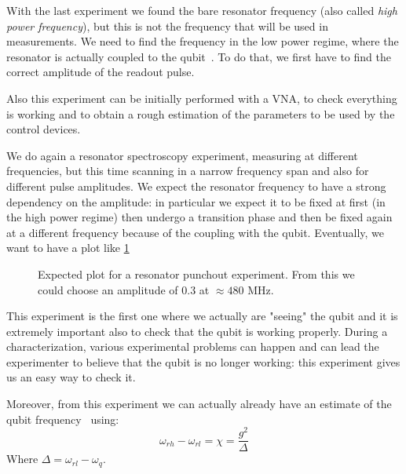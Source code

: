 With the last experiment we found the bare resonator frequency (also called \textit{high power frequency}), but this is not the frequency that will be used in measurements.
We need to find the frequency in the low power regime, where the resonator is actually coupled to the qubit~\cite{Gao2008}.
To do that, we first have to find the correct amplitude of the readout pulse.

Also this experiment can be initially performed with a VNA, to check everything is working and to obtain a rough estimation of the parameters to be used by the control devices.

We do again a resonator spectroscopy experiment, measuring at different frequencies, but this time scanning in a narrow frequency span and also for different pulse amplitudes.
We expect the resonator frequency to have a strong dependency on the amplitude: in particular we expect it to be fixed at first (in the high power regime) then undergo a transition phase and then be fixed again at a different frequency because of the coupling with the qubit.
Eventually, we want to have a plot like \cref{fig:punchout_sketch}

\begin{figure}[ht]
    \caption{Expected plot for a resonator punchout experiment. From this we could choose an amplitude of $0.3$ at $\approx 480$ MHz.}
    \label{fig:punchout_sketch}
\end{figure}

This experiment is the first one where we actually are "seeing" the qubit and it is extremely important also to check that the qubit is working properly.
During a characterization, various experimental problems can happen and can lead the experimenter to believe that the qubit is no longer working: this experiment gives us an easy way to check it.

Moreover, from this experiment we can actually already have an estimate of the qubit frequency~\cite{Majer2007, Roth2021, Gu2017} using:
\begin{equation}
    \omega_{rh} - \omega_{rl} = \chi = \frac{g^2}{\Delta}
\end{equation}
Where $\Delta=\omega_{rl} - \omega_q$.

